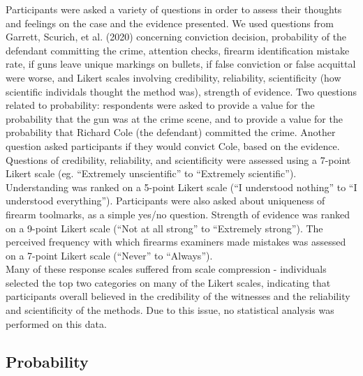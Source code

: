\documentclass[print]{nuthesis}
\begin{document}
Participants were asked a variety of questions in order to assess their thoughts and feelings on the case and the evidence presented.
We used questions from Garrett, Scurich, et al. (2020) concerning conviction decision, probability of the defendant committing the crime, attention checks, firearm identification mistake rate, if guns leave unique markings on bullets, if false conviction or false acquittal were worse, and Likert scales involving credibility, reliability, scientificity (how scientific individals thought the method was), strength of evidence.
Two questions related to probability: respondents were asked to provide a value for the probability that the gun was at the crime scene, and to provide a value for the probability that Richard Cole (the defendant) committed the crime.
Another question asked participants if they would convict Cole, based on the evidence.
Questions of credibility, reliability, and scientificity were assessed using a 7-point Likert scale (eg. ``Extremely unscientific'' to ``Extremely scientific'').
Understanding was ranked on a 5-point Likert scale (``I understood nothing'' to ``I understood everything'').
Participants were also asked about uniqueness of firearm toolmarks, as a simple yes/no question.
Strength of evidence was ranked on a 9-point Likert scale (``Not at all strong'' to ``Extremely strong''). The perceived frequency with which firearms examiners made mistakes was assessed on a 7-point Likert scale (``Never'' to ``Always'').\\
Many of these response scales suffered from scale compression - individuals selected the top two categories on many of the Likert scales, indicating that participants overall believed in the credibility of the witnesses and the reliability and scientificity of the methods.
Due to this issue, no statistical analysis was performed on this data.

\hypertarget{probability}{%
\subsection{Probability}\label{probability}}
\end{document}
